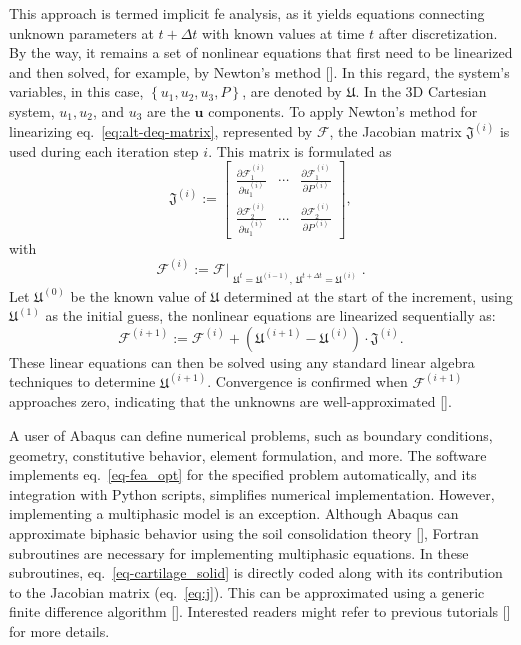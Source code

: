 This approach is termed implicit \ac{fe} analysis, as it yields equations connecting unknown parameters at $t + \Delta t$ with known values at time $t$ after discretization. By the way, it remains a set of nonlinear equations that first need to be linearized and then solved, for example, by Newton's method [\cite{almeida1997,belytschko2014}]. In this regard, the system's variables, in this case, $\left\{ u_1, u_2, u_3, P \right\}$, are denoted by $\mathfrak{U}$. In the 3D Cartesian system, $u_1, u_2$, and $u_3$ are the $\mathbf{u}$ components. To apply Newton's method for linearizing eq.~\ref{eq:alt-deq-matrix}, represented by $\mathcal{F}$, the Jacobian matrix $\mathfrak{J}^{(i)}$ is used during each iteration step $i$. This matrix is formulated as
%
\begin{equation}
    \label{eq:j}
    \mathfrak{J}^{(i)} := \begin{bmatrix}
        \frac{\partial \mathcal{F}^{(i)}_1}{\partial u^{(i)}_1} & \cdots & \frac{\partial \mathcal{F}^{(i)}_1}{\partial P^{(i)}}\\
        \frac{\partial \mathcal{F}^{(i)}_2}{\partial u^{(i)}_1} & \cdots & \frac{\partial \mathcal{F}^{(i)}_2}{\partial P^{(i)}}
    \end{bmatrix},
\end{equation}
%
with
%
\begin{equation}
    \mathcal{F}^{(i)} := \mathcal{F}\Big|_{\substack{\mathfrak{U}^t=\mathfrak{U}^{(i-1)}, \: \mathfrak{U}^{t+\Delta t}=\mathfrak{U}^{(i)}}}.
\end{equation}
%
Let $\mathfrak{U}^{(0)}$ be the known value of $\mathfrak{U}$ determined at the start of the increment, using $\mathfrak{U}^{(1)}$ as the initial guess, the nonlinear equations are linearized sequentially as:
%
\begin{equation}\label{eq-fea_opt}
    \mathcal{F}^{(i+1)} := \mathcal{F}^{(i)} + \left ( \mathfrak{U}^{(i+1)} - \mathfrak{U}^{(i)} \right ) \cdot \mathfrak{J}^{(i)}.
\end{equation}
%
These linear equations can then be solved using any standard linear algebra techniques to determine $\mathfrak{U}^{(i+1)}$. Convergence is confirmed when $\mathcal{F}^{(i+1)}$ approaches zero, indicating that the unknowns are well-approximated [\cite{belytschko2014}].

A user of Abaqus can define numerical problems, such as boundary conditions, geometry, constitutive behavior, element formulation, and more. The software implements eq.~\ref{eq-fea_opt} for the specified problem automatically, and its integration with Python scripts, simplifies numerical implementation. However, implementing a multiphasic model is an exception. Although Abaqus can approximate biphasic behavior using the soil consolidation theory [\cite{verruijt1984}], Fortran subroutines are necessary for implementing multiphasic equations. In these subroutines, eq.~\ref{eq-cartilage_solid} is directly coded along with its contribution to the Jacobian matrix (eq.~\ref{eq:j}). This can be approximated using a generic finite difference algorithm [\cite{miehe1996}]. Interested readers might refer to previous tutorials [\cite{nolan2022,fehervary2020}] for more details.

